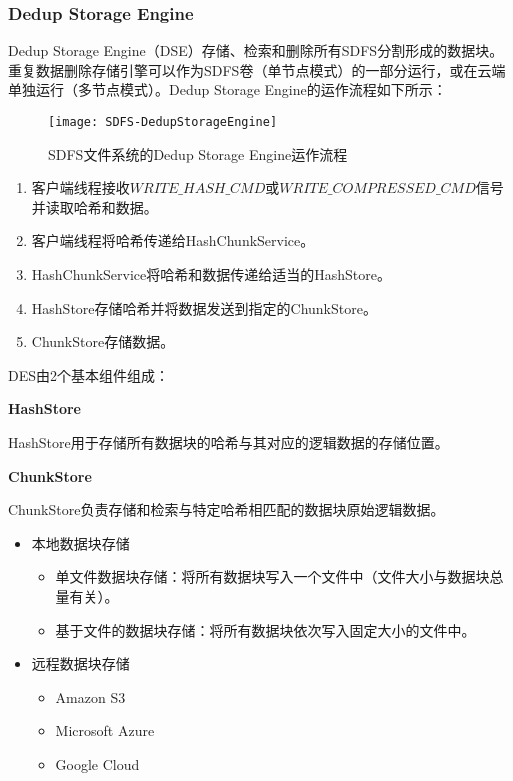 \subsubsection{Dedup Storage Engine}

Dedup Storage Engine（DSE）存储、检索和删除所有SDFS分割形成的数据块。重复数据删除存储引擎可以作为SDFS卷（单节点模式）的一部分运行，或在云端单独运行（多节点模式）。Dedup Storage Engine的运作流程如下所示： 

\begin{figure}[!htb]
    \small
    \centering
    \texttt{[image: SDFS-DedupStorageEngine]}
    \caption{SDFS文件系统的Dedup Storage Engine运作流程} 
    \label{fig:SDFS-DedupStorageEngine}
\end{figure}

\begin{enumerate}
    \item 客户端线程接收$WRITE\_HASH\_CMD$或$WRITE\_COMPRESSED\_CMD$信号并读取哈希和数据。
    \item 客户端线程将哈希传递给HashChunkService。
    \item HashChunkService将哈希和数据传递给适当的HashStore。
    \item HashStore存储哈希并将数据发送到指定的ChunkStore。
    \item ChunkStore存储数据。
\end{enumerate}

DES由2个基本组件组成：

\textbf{HashStore}

HashStore用于存储所有数据块的哈希与其对应的逻辑数据的存储位置。

\textbf{ChunkStore}

ChunkStore负责存储和检索与特定哈希相匹配的数据块原始逻辑数据。

\begin{itemize}
    \item 本地数据块存储
    \begin{itemize}
        \item 单文件数据块存储：将所有数据块写入一个文件中（文件大小与数据块总量有关）。
        \item 基于文件的数据块存储：将所有数据块依次写入固定大小的文件中。
    \end{itemize}
    \item 远程数据块存储
    \begin{itemize}
        \item Amazon S3
        \item Microsoft Azure
        \item Google Cloud
    \end{itemize}
\end{itemize}

